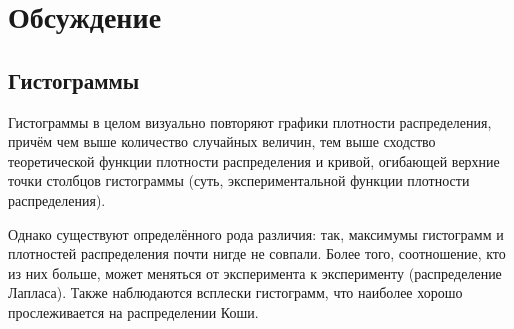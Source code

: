 \section{Обсуждение}
\subsection{Гистограммы}
Гистограммы в целом визуально повторяют графики плотности распределения, причём чем выше количество случайных величин, тем выше сходство теоретической функции плотности распределения и кривой, огибающей верхние точки столбцов гистограммы (суть, экспериментальной функции плотности распределения).

Однако существуют определённого рода различия: так, максимумы гистограмм и плотностей распределения почти нигде не совпали. Более того, соотношение, кто из них больше, может меняться от эксперимента к эксперименту (распределение Лапласа). Также наблюдаются всплески гистограмм, что наиболее хорошо прослеживается на распределении Коши.
